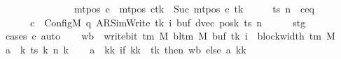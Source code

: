 \begin{isabellebody}
\ \ \ \ \ \ \ \ \ \ \ \ \ \ {\isasymand}\ mt{\isacharunderscore}{\kern0pt}pos\ c{\isacharprime}{\kern0pt}{\isacharprime}{\kern0pt}\ {\isacharequal}{\kern0pt}\ {\isacharparenleft}{\kern0pt}mt{\isacharunderscore}{\kern0pt}pos\ c{\isacharprime}{\kern0pt}{\isacharparenright}{\kern0pt}{\isacharparenleft}{\kern0pt}tk\ {\isacharcolon}{\kern0pt}{\isacharequal}{\kern0pt}\ Suc\ {\isacharparenleft}{\kern0pt}mt{\isacharunderscore}{\kern0pt}pos\ c{\isacharprime}{\kern0pt}\ tk{\isacharparenright}{\kern0pt}{\isacharparenright}{\kern0pt}{\isachardoublequoteclose}\isanewline
%
\isadelimproof
%
\endisadelimproof
%
\isatagproof
{}\isamarkupfalse%
\ {\isacharminus}{\kern0pt}\isanewline
\ \ \isamarkupfalse%
\ ts\ n\ \ c{\isacharprime}{\kern0pt}{\isacharunderscore}{\kern0pt}eq{\isacharcolon}{\kern0pt}\isanewline
\ \ \ \ \ \ {\isachardoublequoteopen}c{\isacharprime}{\kern0pt}\ {\isacharequal}{\kern0pt}\ Config\isactrlsub M\ {\isacharparenleft}{\kern0pt}q{\isacharcomma}{\kern0pt}\ AR{\isacharunderscore}{\kern0pt}SimWrite{\isacharcomma}{\kern0pt}\ tk{\isacharcomma}{\kern0pt}\ i{\isacharcomma}{\kern0pt}\ buf{\isacharcomma}{\kern0pt}\ dvec{\isacharcomma}{\kern0pt}\ posk{\isacharparenright}{\kern0pt}\ ts\ n{\isachardoublequoteclose}\isanewline
\ \ \ \ \isamarkupfalse%
\ stg\ \isamarkupfalse%
\ {\isacharparenleft}{\kern0pt}cases\ c{\isacharprime}{\kern0pt}{\isacharparenright}{\kern0pt}\ auto\isanewline
\ \ \isamarkupfalse%
\ {\isacharquery}{\kern0pt}wb\ {\isacharequal}{\kern0pt}\ {\isachardoublequoteopen}write{\isacharunderscore}{\kern0pt}bit\ {\isacharparenleft}{\kern0pt}{\isasymGamma}{\isacharunderscore}{\kern0pt}tm\ M{\isacharparenright}{\kern0pt}\ {\isacharparenleft}{\kern0pt}bl{\isacharunderscore}{\kern0pt}tm\ M{\isacharparenright}{\kern0pt}\ {\isacharparenleft}{\kern0pt}buf\ tk{\isacharparenright}{\kern0pt}\ {\isacharparenleft}{\kern0pt}i\ {\isacharminus}{\kern0pt}\ block{\isacharunderscore}{\kern0pt}width\ {\isacharparenleft}{\kern0pt}{\isasymGamma}{\isacharunderscore}{\kern0pt}tm\ M{\isacharparenright}{\kern0pt}{\isacharparenright}{\kern0pt}{\isachardoublequoteclose}\isanewline
\ \ \isamarkupfalse%
\ {\isacharquery}{\kern0pt}a\ {\isacharequal}{\kern0pt}\ {\isachardoublequoteopen}{\isasymlambda}k{\isachardot}{\kern0pt}\ ts\ k\ {\isacharparenleft}{\kern0pt}n\ k{\isacharparenright}{\kern0pt}{\isachardoublequoteclose}\isanewline
\ \ \isamarkupfalse%
\ {\isacharquery}{\kern0pt}a{\isacharprime}{\kern0pt}\ {\isacharequal}{\kern0pt}\ {\isachardoublequoteopen}{\isasymlambda}kk{\isachardot}{\kern0pt}\ if\ kk\ {\isacharequal}{\kern0pt}\ tk\ then\ {\isacharquery}{\kern0pt}wb\ else\ {\isacharquery}{\kern0pt}a\ kk{\isachardoublequoteclose}\isanewline

\end{isabellebody}
